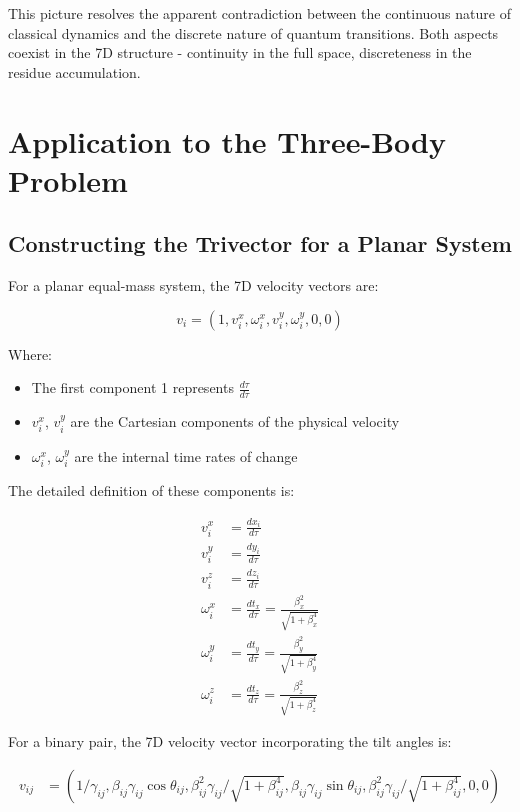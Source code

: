 \documentclass{article}
\begin{document}
This picture resolves the apparent contradiction between the continuous nature of classical dynamics and the discrete nature of quantum transitions. Both aspects coexist in the 7D structure - continuity in the full space, discreteness in the residue accumulation.

\section{Application to the Three-Body Problem}

\subsection{Constructing the Trivector for a Planar System}

For a planar equal-mass system, the 7D velocity vectors are:

\begin{equation}
v_i = (1, v_i^x, \omega_i^x, v_i^y, \omega_i^y, 0, 0)
\end{equation}

Where:
\begin{itemize}
\item The first component 1 represents $\frac{d\tau}{d\tau}$
\item $v_i^x$, $v_i^y$ are the Cartesian components of the physical velocity
\item $\omega_i^x$, $\omega_i^y$ are the internal time rates of change
\end{itemize}

The detailed definition of these components is:

\begin{align}
v_i^x &= \frac{dx_i}{d\tau} \\
v_i^y &= \frac{dy_i}{d\tau} \\
v_i^z &= \frac{dz_i}{d\tau} \\
\omega_i^x &= \frac{dt_x}{d\tau} = \frac{\beta_x^2}{\sqrt{1+\beta_x^4}} \\
\omega_i^y &= \frac{dt_y}{d\tau} = \frac{\beta_y^2}{\sqrt{1+\beta_y^4}} \\
\omega_i^z &= \frac{dt_z}{d\tau} = \frac{\beta_z^2}{\sqrt{1+\beta_z^4}}
\end{align}

For a binary pair, the 7D velocity vector incorporating the tilt angles is:

\begin{align}
v_{ij} &= (1/\gamma_{ij}, \beta_{ij}\gamma_{ij}\cos\theta_{ij}, \beta_{ij}^2\gamma_{ij}/\sqrt{1+\beta_{ij}^4}, \beta_{ij}\gamma_{ij}\sin\theta_{ij}, \beta_{ij}^2\gamma_{ij}/\sqrt{1+\beta_{ij}^4}, 0, 0)
\end{align}
\end{document}
